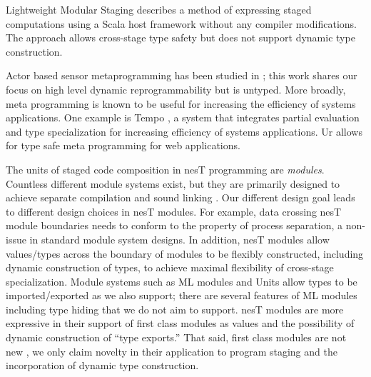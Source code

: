 Lightweight Modular Staging \cite{Rompf-LMS} describes a method of expressing staged
computations using a Scala host framework without any compiler modifications. The approach
allows cross-stage type safety but does not support dynamic type construction.

Actor based sensor metaprogramming has been studied in \cite{cheong07}; this work shares our
focus on high level dynamic reprogrammability but is untyped. More broadly, meta programming is
known to be useful for increasing the efficiency of systems applications. One example is Tempo
\cite{289140}, a system that integrates partial evaluation and type specialization for
increasing efficiency of systems applications. Ur \cite{UrPLDI10} allows for type safe meta
programming for web applications. %


The units of staged code composition in nesT programming are \emph{modules}. Countless different
module systems exist, but they are primarily designed to achieve separate compilation and sound
linking
\cite{Cardelli-1997}. %
Our different design goal leads to different design choices in nesT modules. For example, data
crossing nesT module boundaries needs to conform to the property of process separation, a
non-issue in standard module system designs. In addition, nesT modules allow values/types across
the boundary of modules to be flexibly constructed, including dynamic construction of types, to
achieve maximal flexibility of cross-stage specialization. Module systems such as ML modules
\cite{macqueen84} %
and Units \cite{flatt98units} allow types to be imported/exported as we also support; there are
several features of ML modules including type hiding that we do not aim to
support. %
nesT modules are more expressive in their support of first class modules as values and the
possibility of dynamic construction of ``type exports.'' That said, first class modules are not
new \cite{99620,ancona01calculus}, %
we only claim novelty in their application to program staging and the incorporation of dynamic
type construction.

